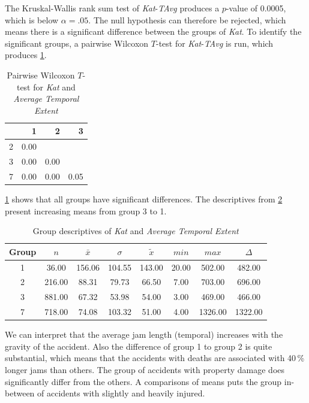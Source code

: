 The Kruskal-Wallis rank sum test of \textit{Kat}-\textit{TAvg} produces a $p$-value of 0.0005, which is below $\alpha=.05$. The null hypothesis can therefore be rejected, which means there is a significant difference between the groups of \textit{Kat}. To identify the significant groups, a pairwise Wilcoxon $T$-test for \textit{Kat}-\textit{TAvg} is run, which produces \cref{tbl:wilcoxon_baysis_matched_Kat_TAvg}.
\begin{table}[ht]
	\tiny
	\centering
	\begin{tabular}{rrrr}
	  	\toprule
	 	& 1 & 2 & 3 \\ 
	  	\midrule
		2 & 0.00 &  &  \\ 
	  	3 & 0.00 & 0.00 &  \\ 
	  	7 & 0.00 & 0.00 & 0.05 \\ 
	   	\bottomrule
	\end{tabular}
	\caption{Pairwise Wilcoxon $T$-test for \textit{Kat} and \textit{Average Temporal Extent}}
	\label{tbl:wilcoxon_baysis_matched_Kat_TAvg}
\end{table}
\cref{tbl:wilcoxon_baysis_matched_Kat_TAvg} shows that all groups have significant differences. The descriptives from \cref{tbl:descriptives_baysis_matched_Kat_TAvg} present increasing means from group 3 to 1.
\begin{table}[ht]
	\tiny
	\centering
	\begin{tabular}{c|c|c|c|c|c|c|c}
	  	\toprule
		Group & $n$ & $\bar{x}$ & $\sigma$ & $\tilde{x}$ & $min$ & $max$ & $\Delta$ \\ 
	  	\midrule
		1 &  36.00 & 156.06 & 104.55 & 143.00 & 20.00 & 502.00 & 482.00 \\ 
	  	2 & 216.00 & 88.31 & 79.73 & 66.50 & 7.00 & 703.00 & 696.00 \\ 
	  	3 & 881.00 & 67.32 & 53.98 & 54.00 & 3.00 & 469.00 & 466.00 \\ 
	  	7 & 718.00 & 74.08 & 103.32 & 51.00 & 4.00 & 1326.00 & 1322.00 \\ 
	   	\bottomrule
	\end{tabular}
	\caption{Group descriptives of \textit{Kat} and \textit{Average Temporal Extent}}
	\label{tbl:descriptives_baysis_matched_Kat_TAvg}
\end{table}
We can interpret that the average jam length (temporal) increases with the gravity of the accident. Also the difference of group 1 to group 2 is quite substantial, which means that the accidents with deaths are associated with 40\,\% longer jams than others. The group of accidents with property damage does significantly differ from the others. A comparisons of means puts the group in-between of accidents with slightly and heavily injured.

